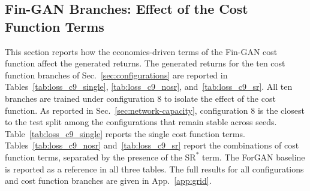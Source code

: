 \subsection{Fin-GAN Branches: Effect of the Cost Function Terms}\label{sec:effect-cost}
This section reports how the economics-driven terms of the Fin-GAN cost function affect the generated returns. The generated returns for the ten cost function branches of Sec.~\ref{sec:configurations} are reported in Tables~\ref{tab:loss_c9_single}, \ref{tab:loss_c9_nosr}, and~\ref{tab:loss_c9_sr}. All ten branches are trained under configuration 8 to isolate the effect of the cost function. As reported in Sec.~\ref{sec:network-capacity}, configuration 8 is the closest to the test split among the configurations that remain stable across seeds. Table~\ref{tab:loss_c9_single} reports the single cost function terms. Tables~\ref{tab:loss_c9_nosr} and~\ref{tab:loss_c9_sr} report the combinations of cost function terms, separated by the presence of the $\mathrm{SR}^{*}$ term. The ForGAN baseline is reported as a reference in all three tables. The full results for all configurations and cost function branches are given in App.~\ref{app:grid}.

